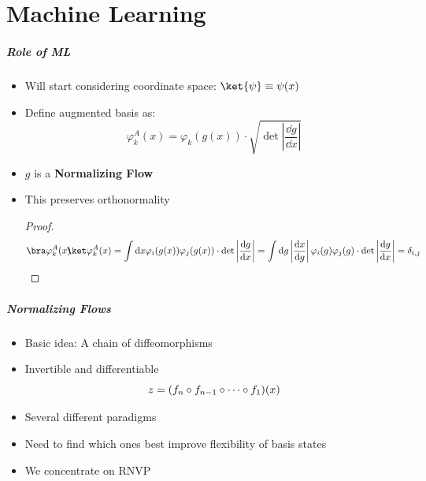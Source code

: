 \part[Part slide]{Machine Learning}
\makepart%


\begin{frame}
    \frametitle{Role of ML}
    \begin{itemize}[<+->]
        \setlength\itemsep{1em}
        \item Will start considering coordinate space: $\ket{\psi} \equiv \psi(x)$
        \item Define augmented basis as:
            \begin{equation}
                \varphi_k^A(x) = \varphi_k(g(x)) \cdot \sqrt{\det\left|\frac{\dd g}{\dd x}\right|}
            \end{equation}
        \item $g$ is a \textbf{Normalizing Flow}
        \item This preserves orthonormality
            \begin{proof}
                \[
                    \inner{\varphi_k^A(x)}{\varphi_k^A(x)} = 
                    \int \dd x \varphi_i(g(x))\varphi_j(g(x)) \cdot \det\left|\frac{\dd g}{\dd x}\right|=
                    \int \dd g \left|\frac{\dd x}{\dd g}\right| \varphi_i(g)\varphi_j(g) \cdot \det\left|\frac{\dd g}{\dd x}\right|= \delta_{i, j}
                \]
            \end{proof} 
    \end{itemize}
\end{frame}

\begin{frame}
    \frametitle{Normalizing Flows}
    \begin{itemize}[<+->]
        \setlength\itemsep{1em}
        \item Basic idea: A chain of diffeomorphisms
        \item Invertible and differentiable
        \begin{equation*}
            \boldmath{z} = (f_n\circ f_{n-1} \circ \dots \circ f_1 )(\boldmath{x})
        \end{equation*}
        \item Several different paradigms
        \item Need to find which ones best improve flexibility of basis states
        \item We concentrate on RNVP 
    \end{itemize}
\end{frame}

